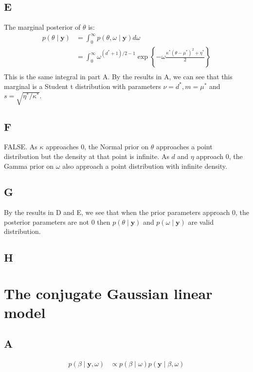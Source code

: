 \documentclass{article}
\begin{document}
\subsection*{E}
The marginal posterior of \(\theta\) is:
\begin{align*}
p(\theta \mid \mathbf{y}) &= \int_0^{\infty} p(\theta, \omega \mid \mathbf{y}) d\omega\\
&= \int_0^{\infty} \omega^{(d^*+1)/2-1} \exp \left\lbrace -\omega\frac{\kappa^*(\theta-\mu^*)^2 + \eta^*}{2}\right\rbrace\\
\end{align*}
This is the same integral in part A. By the results in A, we can see that this marginal is a Student t distribution with parameters \(\nu = d^*, m = \mu^*\) and \(s = \sqrt{\eta^*/\kappa^*}\).

\subsection*{F}
FALSE. As \(\kappa\) approaches \(0\), the Normal prior on \(\theta\) approaches a point distribution but the density at that point is infinite. As \(d\) and \(\eta\) approach \(0\), the Gamma prior on \(\omega\) also approach a point distribution with infinite density.

\subsection*{G}
By the results in D and E, we see that when the prior parameters approach \(0\), the posterior parameters are not \(0\) then \(p(\theta \mid \mathbf{y})\) and \(p(\omega \mid \mathbf{y})\) are valid distribution.


\subsection*{H}

\section{The conjugate Gaussian linear model}
\subsection*{A}
\begin{align*}
p(\beta \mid \mathbf{y}, \omega) &\propto p(\beta \mid \omega) p(\mathbf{y} \mid \beta, \omega)\\
\end{align*}
\end{document}
